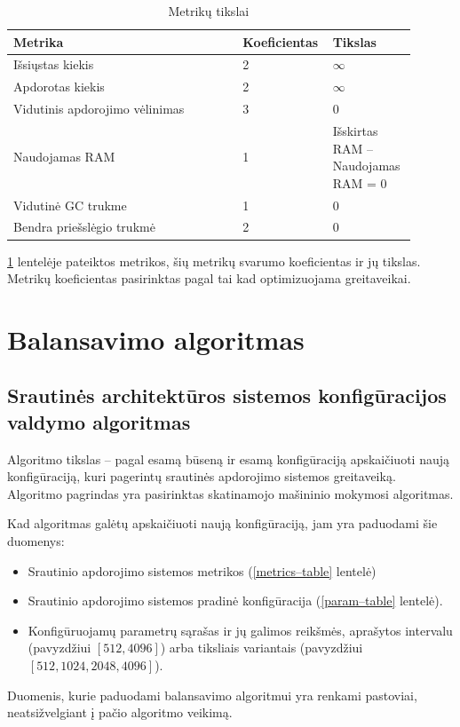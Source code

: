 \documentclass{VUMIFPSbakalaurinis}
\begin{document}
\begin{longtable}{|p{0.55\linewidth}|p{0.15\linewidth}|p{0.2\linewidth}|}
    \caption{Metrikų tikslai}
    \label{goal–table}\\
    \hline
    \rowcolor[HTML]{C0C0C0} 
    Metrika                         & Koeficientas & Tikslas          \\ \hline
    \endfirsthead
    \endhead
    Išsiųstas kiekis                & 2 & \(\infty\)  \\ \hline
    Apdorotas kiekis                & 2 & \(\infty\) \\ \hline
    Vidutinis apdorojimo vėlinimas  & 3 & 0    \\ \hline
    Naudojamas RAM                  & 1 & Išskirtas RAM – Naudojamas RAM = 0      \\ \hline
    Vidutinė GC trukme              & 1 & 0    \\ \hline
    Bendra priešslėgio trukmė       & 2 & 0    \\ \hline
\end{longtable}

\ref{goal–table} lentelėje pateiktos metrikos, šių metrikų svarumo koeficientas ir jų tikslas. Metrikų koeficientas pasirinktas pagal tai kad optimizuojama greitaveikai. 

\section{Balansavimo algoritmas}

\subsection{Srautinės architektūros sistemos konfigūracijos valdymo algoritmas}

Algoritmo tikslas – pagal esamą būseną ir esamą konfigūraciją apskaičiuoti naują konfigūraciją, kuri pagerintų srautinės apdorojimo sistemos greitaveiką. Algoritmo pagrindas yra pasirinktas skatinamojo mašininio mokymosi algoritmas.

Kad algoritmas galėtų apskaičiuoti naują konfigūraciją, jam yra paduodami šie duomenys:
\begin{itemize}
    \item Srautinio apdorojimo sistemos metrikos (\ref{metrics–table} lentelė)
    \item Srautinio apdorojimo sistemos pradinė konfigūracija (\ref{param–table} lentelė).
    \item Konfigūruojamų parametrų sąrašas ir jų galimos reikšmės, aprašytos intervalu (pavyzdžiui \([512,4096]\)) arba tiksliais variantais (pavyzdžiui \([512, 1024, 2048, 4096]\)).
\end{itemize}
Duomenis, kurie paduodami balansavimo algoritmui yra renkami pastoviai, neatsižvelgiant į pačio algoritmo veikimą.
\end{document}
